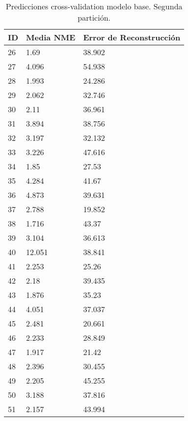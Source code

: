 \begin{table}[!ht]
    \centering
    \caption{Predicciones cross-validation modelo base. Segunda partición.}
    \begin{tabular}{|l|l|l|}
    \hline
        \cellcolor{gray!25}\textbf{ID} & \cellcolor{gray!25}\textbf{Media NME} & \cellcolor{gray!25}\textbf{Error de Reconstrucción} \\ \hline
        26 & 1.69 & 38.902 \\ \hline
        27 & 4.096 & 54.938 \\ \hline
        28 & 1.993 & 24.286 \\ \hline
        29 & 2.062 & 32.746 \\ \hline
        30 & 2.11 & 36.961 \\ \hline
        31 & 3.894 & 38.756 \\ \hline
        32 & 3.197 & 32.132 \\ \hline
        33 & 3.226 & 47.616 \\ \hline
        34 & 1.85 & 27.53 \\ \hline
        35 & 4.284 & 41.67 \\ \hline
        36 & 4.873 & 39.631 \\ \hline
        37 & 2.788 & 19.852 \\ \hline
        38 & 1.716 & 43.37 \\ \hline
        39 & 3.104 & 36.613 \\ \hline
        40 & 12.051 & 38.841 \\ \hline
        41 & 2.253 & 25.26 \\ \hline
        42 & 2.18 & 39.435 \\ \hline
        43 & 1.876 & 35.23 \\ \hline
        44 & 4.051 & 37.037 \\ \hline
        45 & 2.481 & 20.661 \\ \hline
        46 & 2.233 & 28.849 \\ \hline
        47 & 1.917 & 21.42 \\ \hline
        48 & 2.396 & 30.455 \\ \hline
        49 & 2.205 & 45.255 \\ \hline
        50 & 3.188 & 37.816 \\ \hline
        51 & 2.157 & 43.994 \\ \hline
    \end{tabular}
\end{table}

